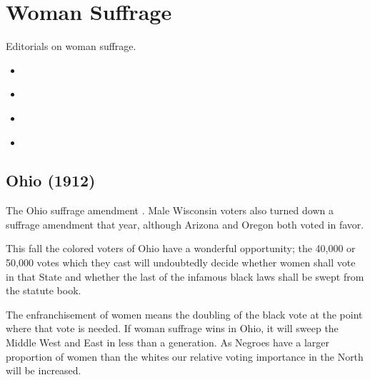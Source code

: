 \documentclass[letterpaper,10pt,english]{jupyterBook}
\begin{document}
\chapter{Woman Suffrage}
\label{\detokenize{Sections/womansuffrage:woman-suffrage}}\label{\detokenize{Sections/womansuffrage::doc}}
\sphinxAtStartPar
Editorials on woman suffrage.
\begin{itemize}
\item {} 
\sphinxAtStartPar
{\hyperref[\detokenize{Volumes/04/04/ohio::doc}]{}}

\item {} 
\sphinxAtStartPar
{\hyperref[\detokenize{Volumes/09/06/womansuffrage::doc}]{}}

\item {} 
\sphinxAtStartPar
{\hyperref[\detokenize{Volumes/09/03/agility::doc}]{}}

\item {} 
\sphinxAtStartPar
{\hyperref[\detokenize{Volumes/15/01/votes_for_women::doc}]{}}

\end{itemize}


\section{Ohio (1912)}
\label{\detokenize{Volumes/04/04/ohio:ohio-1912}}\label{\detokenize{Volumes/04/04/ohio::doc}}
\begin{sphinxShadowBox}
\sphinxstylesidebartitle{}

\sphinxAtStartPar
The Ohio suffrage amendment . Male Wisconsin voters also turned down a suffrage amendment that year, although Arizona and Oregon both voted in favor.
\end{sphinxShadowBox}

\sphinxAtStartPar
This fall the colored voters of Ohio have a wonderful opportunity; the 40,000 or 50,000 votes which they cast will undoubtedly decide whether women shall vote in that State and whether the last of the infamous black laws shall be swept from the statute book.

\sphinxAtStartPar
The enfranchisement of women means the doubling of the black vote at the point where that vote is needed. If woman suffrage wins in Ohio, it will sweep the Middle West and East in less than a generation. As Negroes have a larger proportion of women than the whites our relative voting importance in the North will be increased.
\end{document}
